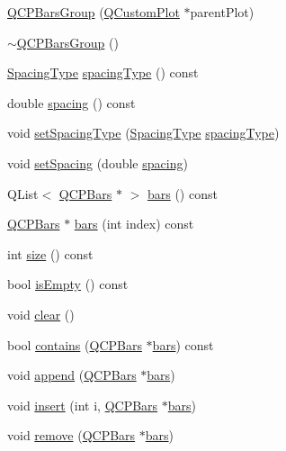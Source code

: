 \begin{DoxyCompactItemize}
\item 
\hyperlink{classQCPBarsGroup_aa4e043b9a22c6c5ea0f93740aca063e1}{Q\+C\+P\+Bars\+Group} (\hyperlink{classQCustomPlot}{Q\+Custom\+Plot} $\ast$parent\+Plot)
\item 
\hyperlink{classQCPBarsGroup_adb9475bcb6a5f18c8918e17d939d8dbd}{$\sim$\+Q\+C\+P\+Bars\+Group} ()
\item 
\hyperlink{classQCPBarsGroup_a4c0521120a97e60bbca37677a37075b6}{Spacing\+Type} \hyperlink{classQCPBarsGroup_a1bb562f669d47bd7d3cdd2da1f7d8f00}{spacing\+Type} () const 
\item 
double \hyperlink{classQCPBarsGroup_a730bffefcac6c97aaf60e6f64dd3bcd9}{spacing} () const 
\item 
void \hyperlink{classQCPBarsGroup_a2c7e2d61b10594a4555b615e1fcaf49e}{set\+Spacing\+Type} (\hyperlink{classQCPBarsGroup_a4c0521120a97e60bbca37677a37075b6}{Spacing\+Type} \hyperlink{classQCPBarsGroup_a1bb562f669d47bd7d3cdd2da1f7d8f00}{spacing\+Type})
\item 
void \hyperlink{classQCPBarsGroup_aa553d327479d72a0c3dafcc724a190e2}{set\+Spacing} (double \hyperlink{classQCPBarsGroup_a730bffefcac6c97aaf60e6f64dd3bcd9}{spacing})
\item 
Q\+List$<$ \hyperlink{classQCPBars}{Q\+C\+P\+Bars} $\ast$ $>$ \hyperlink{classQCPBarsGroup_a7c72ed1f8cd962c93b8c42ab96cd91ec}{bars} () const 
\item 
\hyperlink{classQCPBars}{Q\+C\+P\+Bars} $\ast$ \hyperlink{classQCPBarsGroup_a72d022790b7c93151c95c28eefaf51b4}{bars} (int index) const 
\item 
int \hyperlink{classQCPBarsGroup_af07364189c5717a158ec95b609687532}{size} () const 
\item 
bool \hyperlink{classQCPBarsGroup_a1d89da4e9176f4f77105e9a4afd44e2b}{is\+Empty} () const 
\item 
void \hyperlink{classQCPBarsGroup_a3ddf23928c6cd89530bd34ab7ba7b177}{clear} ()
\item 
bool \hyperlink{classQCPBarsGroup_adb4837894167e629e42e200db056fac3}{contains} (\hyperlink{classQCPBars}{Q\+C\+P\+Bars} $\ast$\hyperlink{classQCPBarsGroup_a7c72ed1f8cd962c93b8c42ab96cd91ec}{bars}) const 
\item 
void \hyperlink{classQCPBarsGroup_a809ed63cc4ff7cd5b0b8c96b470163d3}{append} (\hyperlink{classQCPBars}{Q\+C\+P\+Bars} $\ast$\hyperlink{classQCPBarsGroup_a7c72ed1f8cd962c93b8c42ab96cd91ec}{bars})
\item 
void \hyperlink{classQCPBarsGroup_a309a5f7233db189f3ea9c2d04ece6c13}{insert} (int i, \hyperlink{classQCPBars}{Q\+C\+P\+Bars} $\ast$\hyperlink{classQCPBarsGroup_a7c72ed1f8cd962c93b8c42ab96cd91ec}{bars})
\item 
void \hyperlink{classQCPBarsGroup_a215e28a5944f1159013a0e19169220e7}{remove} (\hyperlink{classQCPBars}{Q\+C\+P\+Bars} $\ast$\hyperlink{classQCPBarsGroup_a7c72ed1f8cd962c93b8c42ab96cd91ec}{bars})
\end{DoxyCompactItemize}
